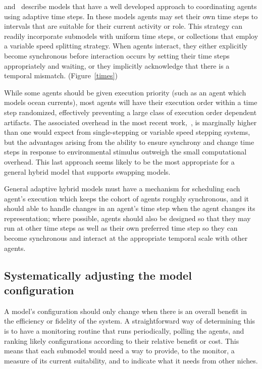 \cite{gray2006nws} and~\cite{Fulton2009crossingscales} describe models that have a well %
developed approach to coordinating agents using adaptive time
steps. In these models agents may set their own time steps to
intervals that are suitable for their current activity or role. This
strategy can readily incorporate sub\-models with uniform time steps, or
collections that employ a variable speed splitting strategy. When
agents interact, they either explicitly become synchronous before
interaction occurs by setting their time steps appropriately and
waiting, or they implicitly acknowledge that there is a temporal
mismatch. (Figure~\ref{times})

While some agents should be given execution priority (such as an agent
which models ocean currents), most agents will have their execution
order within a time step randomized, effectively preventing a large
class of execution order dependent artifacts.  The associated overhead
in the most recent work,~\cite{gray2006nws,gray2012adaptive}, is marginally higher
than one would expect from single-stepping or variable speed stepping
systems, but the advantages arising from the ability to ensure
synchrony and change time steps in response to en\-vi\-ron\-men\-tal stimulus
outweigh the small computational overhead.  This last approach seems
likely to be the most appropriate for a general hybrid model that
supports swapping models.

General adaptive hybrid models must have a mechanism for scheduling
each agent's execution which keeps the cohort of agents roughly
synchronous, and it should able to handle changes in an agent's time
step when the agent changes its rep\-re\-sen\-ta\-tion; where possible, agents
should also be designed so that they may run at other time steps as
well as their own preferred time step so they can become synchronous
and interact at the appropriate temporal scale with other agents.


\subsection{Systematically adjusting the model con\-fig\-ur\-a\-tion}

A model's con\-fig\-ur\-a\-tion should only change when there is an overall
benefit in the efficiency or fidelity of the system.  A
straightforward way of determining this is to have a monitoring
routine that runs periodically, polling the agents, and ranking likely
con\-fig\-ur\-a\-tions according to their relative benefit or cost.  This
means that each sub\-model would need a way to provide, to the monitor,
a measure of its current suitability, and to indicate what it needs
from other niches. 



